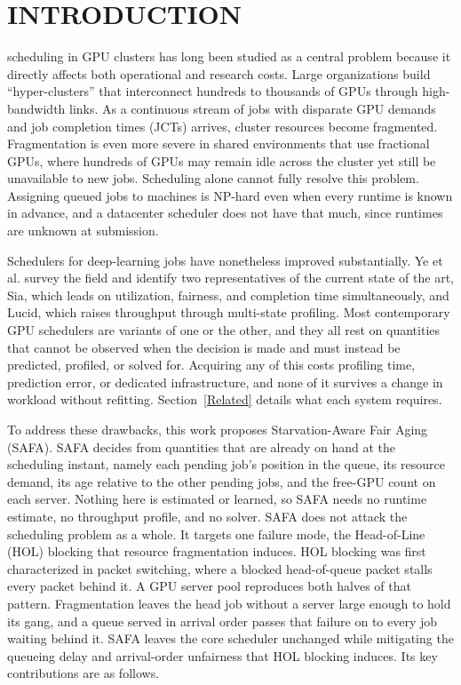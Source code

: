 \documentclass{ieeetj}
\begin{document}
\maketitle


\section{INTRODUCTION}\label{sec1}
 scheduling in GPU clusters has long been studied as a central problem because it directly affects both operational and research costs. Large organizations build ``hyper-clusters'' that interconnect hundreds to thousands of GPUs through high-bandwidth links. As a continuous stream of jobs with disparate GPU demands and job completion times (JCTs) arrives, cluster resources become fragmented\cite{athlur2022varuna}. Fragmentation is even more severe in shared environments that use fractional GPUs, where hundreds of GPUs may remain idle across the cluster yet still be unavailable to new jobs\cite{weng2023beware}. Scheduling alone cannot fully resolve this problem. Assigning queued jobs to machines is NP-hard even when every runtime is known in advance\cite{ullman1975np,b1}, and a datacenter scheduler does not have that much, since runtimes are unknown at submission\cite{b2}.

Schedulers for deep-learning jobs have nonetheless improved substantially. Ye et al.\cite{b3} survey the field and identify two representatives of the current state of the art, Sia\cite{b4}, which leads on utilization, fairness, and completion time simultaneously, and Lucid\cite{b5}, which raises throughput through multi-state profiling. Most contemporary GPU schedulers are variants of one or the other, and they all rest on quantities that cannot be observed when the decision is made and must instead be predicted, profiled, or solved for. Acquiring any of this costs profiling time, prediction error, or dedicated infrastructure, and none of it survives a change in workload without refitting. Section~\ref{Related} details what each system requires.

To address these drawbacks, this work proposes Starvation-Aware Fair Aging (SAFA). SAFA decides from quantities that are already on hand at the scheduling instant, namely each pending job's position in the queue, its resource demand, its age relative to the other pending jobs, and the free-GPU count on each server. Nothing here is estimated or learned, so SAFA needs no runtime estimate, no throughput profile, and no solver. SAFA does not attack the scheduling problem as a whole. It targets one failure mode, the Head-of-Line (HOL) blocking\cite{karol1987hol} that resource fragmentation induces. HOL blocking was first characterized in packet switching, where a blocked head-of-queue packet stalls every packet behind it. A GPU server pool reproduces both halves of that pattern. Fragmentation leaves the head job without a server large enough to hold its gang, and a queue served in arrival order passes that failure on to every job waiting behind it. SAFA leaves the core scheduler unchanged while mitigating the queueing delay and arrival-order unfairness that HOL blocking induces. Its key contributions are as follows.
\end{document}
